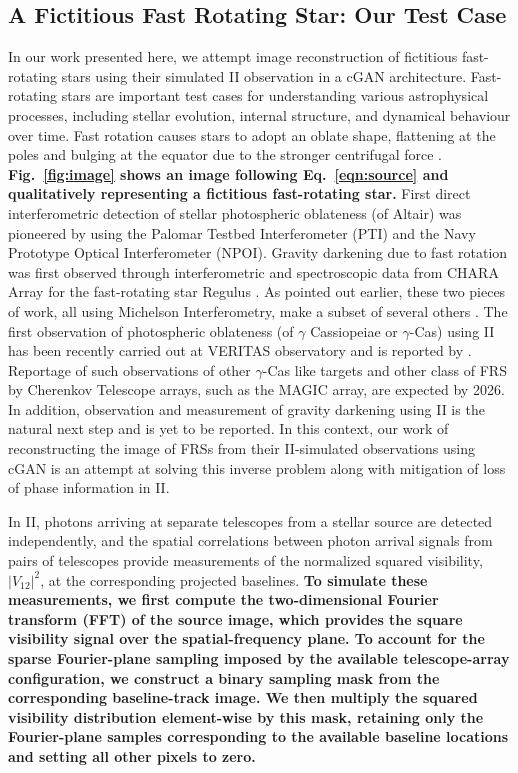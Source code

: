 \subsection{A Fictitious Fast Rotating Star: Our Test Case}
In our work presented here, we attempt image reconstruction of fictitious fast-rotating stars using their simulated II observation in a cGAN architecture. Fast-rotating stars are important test cases for understanding various astrophysical processes, including stellar evolution, internal structure, and dynamical behaviour over time. Fast rotation causes stars to adopt an oblate shape, flattening at the poles and bulging at the equator due to the stronger centrifugal force \citep[e.g.,][]{von1924radiative, 1999A&A...347..185M}. {\bf Fig.~\ref{fig:image} shows an image following Eq.~\ref{eqn:source} and qualitatively representing a fictitious fast-rotating star.} First direct interferometric detection of stellar photospheric oblateness (of Altair) was pioneered by \cite{vanBelle2001} using the Palomar Testbed Interferometer (PTI) and the Navy Prototype Optical Interferometer (NPOI). Gravity darkening due to fast rotation was first observed through interferometric and spectroscopic data from CHARA Array for the fast-rotating star Regulus \citep{mcalister2005first}.  As pointed out earlier, these two pieces  of work, all using Michelson Interferometry, make a subset of several others \citep{vanBelle2001, DomicianodeSouza2003, mcalister2005first, DomicianodeSouza2005, Monnier2007, Pedretti2009, Zhao2009, Martinez2021}. The first observation of photospheric oblateness (of $\gamma$ Cassiopeiae or $\gamma$-Cas) using II has been recently carried out at VERITAS observatory and is reported by \cite{Archer-arXiv-2025}. Reportage of such observations of other $\gamma$-Cas like targets and other class of FRS by Cherenkov Telescope arrays, such as  the MAGIC array, are expected by 2026. In addition, observation and measurement of gravity darkening using II is the natural next step and is yet to be reported. In this context, our work of reconstructing the image of FRSs from their II-simulated observations using cGAN is an attempt at solving this inverse problem along with mitigation of loss of phase information in II. 

In II, photons arriving at separate telescopes from a stellar source are detected independently, and the spatial correlations between photon arrival signals from pairs of telescopes provide measurements of the normalized squared visibility, $|V_{12}|^2$, at the corresponding projected baselines. {\bf To simulate these measurements, we first compute the two-dimensional Fourier transform (FFT) of the source image, which provides the square visibility signal over the spatial-frequency plane. To account for the sparse Fourier-plane sampling imposed by the available telescope-array configuration, we construct a binary sampling mask from the corresponding baseline-track image. We then multiply the squared visibility distribution element-wise by this mask, retaining only the Fourier-plane samples corresponding to the available baseline locations and setting all other pixels to zero.}

